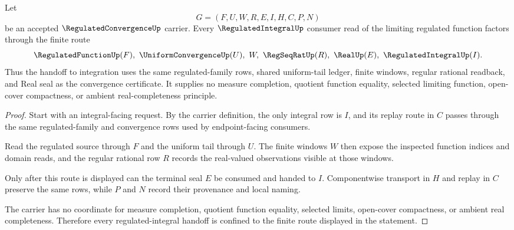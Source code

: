 \begin{theorem}
\label{thm:regulated-convergence-integral-handoff}
Let
$$
G=(F,U,W,R,E,I,H,C,P,N)
$$
be an accepted $\RegulatedConvergenceUp$ carrier. Every $\RegulatedIntegralUp$ consumer read of the limiting regulated function factors through the finite route
$$
\RegulatedFunctionUp(F),\ \UniformConvergenceUp(U),\ W,\ \RegSeqRatUp(R),\ \RealUp(E),\ \RegulatedIntegralUp(I).
$$
Thus the handoff to integration uses the same regulated-family rows, shared uniform-tail ledger, finite windows, regular rational readback, and Real seal as the convergence certificate. It supplies no measure completion, quotient function equality, selected limiting function, open-cover compactness, or ambient real-completeness principle.
\end{theorem}
\begin{proof}
Start with an integral-facing request. By the carrier definition, the only integral row is $I$, and its replay route in $C$ passes through the same regulated-family and convergence rows used by endpoint-facing consumers.

Read the regulated source through $F$ and the uniform tail through $U$. The finite windows $W$ then expose the inspected function indices and domain reads, and the regular rational row $R$ records the real-valued observations visible at those windows.

Only after this route is displayed can the terminal seal $E$ be consumed and handed to $I$. Componentwise transport in $H$ and replay in $C$ preserve the same rows, while $P$ and $N$ record their provenance and local naming.

The carrier has no coordinate for measure completion, quotient function equality, selected limits, open-cover compactness, or ambient real completeness. Therefore every regulated-integral handoff is confined to the finite route displayed in the statement.
\end{proof}



